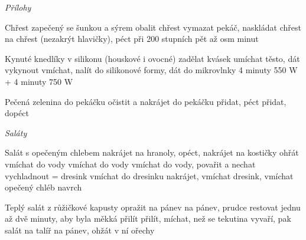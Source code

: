 \documentclass[12pt,a4paper]{article}
\begin{document}
\vspace*{\fill}
\hfill {\Huge\it Přílohy}\hfill
\vspace*{\fill}
\newpage

\begin{recipe}{Chřest zapečený se šunkou a sýrem}
   obalit chřest
   vymazat pekáč, naskládat chřest
   na chřest (nezakrýt hlavičky), péct při 200 stup\-ních pět až osm minut
\end{recipe}
\newpage

\begin{recipe}{Kynuté knedlíky v silikonu (houskové i ovocné)}
   zadělat kvásek
   umíchat těsto, dát vykynout
   vmíchat, nalít do silikonové formy, dát do mikrovlnky 4 minuty 550 W + 4 minuty 750 W
\end{recipe}
\newpage

\begin{recipe}{Pečená zelenina}
   do pekáčku
   očistit a nakrájet do pekáčku
   přidat, péct
   přidat, dopéct
\end{recipe}
\newpage

\vspace*{\fill}
\hfill {\Huge\it Saláty}\hfill
\vspace*{\fill}
\newpage

\begin{recipe}{Salát s opečeným chlebem}
   nakrájet na hranoly, opéct, nakrá\-jet na kostičky
   ohřát
   vmíchat do vody
   vmíchat do vody
   vmíchat do vody, povařit a nechat vychladnout = dresink
   vmíchat do dresinku
   nakrájet, vmíchat dresink, vmíchat ope\-če\-ný chléb
   navrch
\end{recipe}
\newpage

\begin{recipe}{Teplý salát z růžičkové kapusty}
   opražit
   na pánev
   na pánev, prudce restovat jednu až dvě minuty, aby byla měkká
   přilít
   přilít, míchat, než se tekutina vyvaří, pak salát na talíř
   na pánev, ohžát v ní ořechy
\end{recipe}
\newpage
\end{document}
